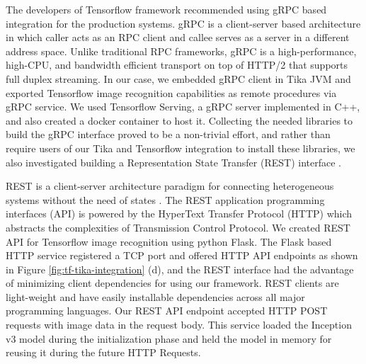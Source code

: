 The developers of Tensorflow framework recommended using gRPC based integration for the production systems\cite{goog-tfserve}. gRPC is a client-server based architecture in which caller acts as an RPC client and callee serves as a server in a different address space. Unlike traditional RPC frameworks, gRPC is a high-performance, high-CPU, and bandwidth efficient transport on top of HTTP/2 that supports full duplex streaming\cite{about-grpc}. In our case, we embedded gRPC client in Tika JVM and exported Tensorflow image recognition capabilities as remote procedures via gRPC service. We used Tensorflow Serving, a gRPC server implemented in C++, and also created a docker container to host it.  Collecting the needed libraries to build the gRPC interface proved to be a non-trivial effort, and rather than require users of our Tika and Tensorflow integration to install these libraries, we also investigated building a Representation State Transfer (REST) interface \cite{Fielding:2000:ASD:932295}.

REST is a client-server architecture paradigm for connecting heterogeneous systems without the need of states \cite[Chapter~5]{Fielding:2000:ASD:932295}. The REST application programming interfaces (API) is powered by the HyperText Transfer Protocol (HTTP) which abstracts the complexities of Transmission Control Protocol.
We created REST API for Tensorflow image recognition using python Flask. The Flask based HTTP service registered a TCP port and offered HTTP API endpoints as shown in Figure \ref{fig:tf-tika-integration} (d), and the REST interface had the advantage of minimizing client dependencies for using our framework. REST clients are light-weight and have easily installable dependencies across all major programming languages. Our REST API endpoint accepted HTTP POST requests with image data in the request body. This service loaded the Inception v3 \cite{SzegedyVISW15} model during the initialization phase and held the model in memory for reusing it during the future HTTP Requests.



